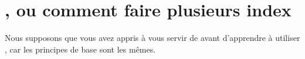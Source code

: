 
\section{, ou comment faire plusieurs index}

\begin{prealable}
Nous supposons que vous avez appris à vous servir de  avant d'apprendre à utiliser , car les principes de base sont les mêmes.
\end{prealable}

